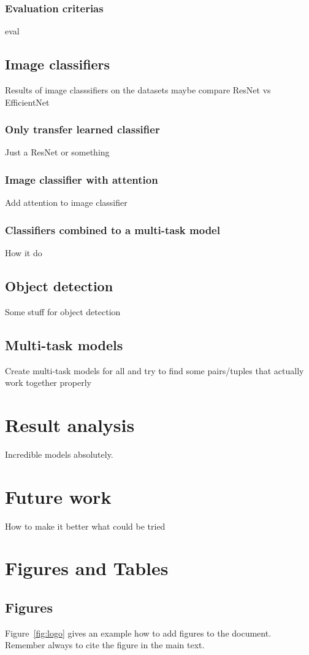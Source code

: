\subsection{Evaluation criterias}
eval
\section{Image classifiers}
Results of image classsifiers on the datasets maybe compare ResNet vs EfficientNet
\subsection{Only transfer learned classifier}
Just a ResNet or something
\subsection{Image classifier with attention}
Add attention to image classifier
\subsection{Classifiers combined to a multi-task model}
How it do
\section{Object detection}
Some stuff for object detection
\section{Multi-task models}
Create multi-task models for all and try to find some pairs/tuples that actually work together properly
\chapter{Result analysis}
Incredible models absolutely.

\chapter{Future work}
How to make it better what could be tried 

\chapter{Figures and Tables}

\section{Figures}
Figure~\ref{fig:logo} gives an example how to add figures to the document. Remember always to cite the figure in the main text.

